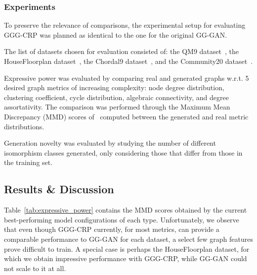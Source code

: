 \subsubsection{Experiments}

To preserve the relevance of comparisons, the experimental setup for evaluating GGG-CRP was planned as identical to the one for the original GG-GAN.

The list of datasets chosen for evaluation consisted of: the QM9 dataset~\cite{de_cao_molgan_2018}, the HouseFloorplan dataset~\cite{nauata_house-gan_2020}, the Chordal9 dataset~\cite{mckay_chordal_2020}, and the Community20 dataset~\cite{niu_permutation_2020}.

Expressive power was evaluated by comparing real and generated graphs w.r.t. 5 desired graph metrics of increasing complexity: node degree distribution, clustering coefficient, cycle distribution, algebraic connectivity, and degree assortativity. The comparison was performed through the Maximum Mean Discrepancy (MMD) scores of~\cite{you_graphrnn_2018} computed between the generated and real metric distributions.

Generation novelty was evaluated by studying the number of different isomorphism classes generated, only considering those that differ from those in the training set.

\subsection{Results \& Discussion}
\label{sec:results_gggcrp}

Table~\ref{tab:expressive_power} contains the MMD scores obtained by the current best-performing model configurations of each type. Unfortunately, we observe that even though GGG-CRP currently, for most metrics, can provide a comparable performance to GG-GAN for each dataset, a select few graph features prove difficult to train. A special case is perhaps the HouseFloorplan dataset, for which we obtain impressive performance with GGG-CRP, while GG-GAN could not scale to it at all.

